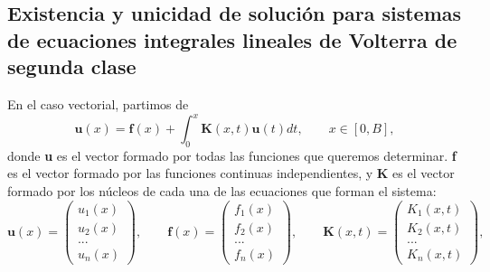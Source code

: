 \subsection{Existencia y unicidad de solución para sistemas de ecuaciones integrales lineales de Volterra de segunda clase}
En el caso vectorial, partimos de
\begin{equation}
	\textbf{u}(x) = \textbf{f}(x) + \int_0^x \textbf{K}(x,t)\textbf{u}(t)dt, \qquad x \in [0,B],
\end{equation}
donde \textbf{u} es el vector formado por todas las funciones que queremos determinar. \textbf{f} es el vector formado por las funciones continuas independientes, y \textbf{K} es el vector formado por los núcleos de cada una de las ecuaciones que forman el sistema:
\begin{equation}
	\textbf{u}(x) = \begin{pmatrix}	u_1(x) \\ u_2(x) \\ ... \\ u_n(x)	\end{pmatrix}, \qquad \textbf{f}(x) = \begin{pmatrix}	f_1(x) \\ f_2(x) \\ ... \\ f_n(x)	\end{pmatrix}, \qquad \textbf{K}(x,t) = \begin{pmatrix}	K_1(x,t) \\ K_2(x,t) \\ ... \\ K_n(x,t)	\end{pmatrix},
\end{equation}

\endinput
